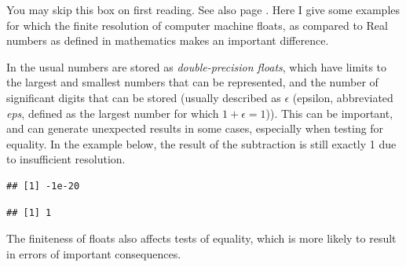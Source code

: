 \documentclass[krantz2]{krantz}\usepackage{knitr}%
\begin{document}
\begin{explainbox}
\label{box:floats} \label{par:float}
%
You may skip this box on first reading. See also page \pageref{par:float}. Here I give some examples for which the finite resolution of computer machine floats, as compared to Real numbers as defined in mathematics makes an important difference.

In \Rpgrm the usual numbers are stored as \emph{double-precision floats}, which have limits to the largest and smallest numbers that can be represented, and the number of significant digits that can be stored (usually described as $\epsilon$ (epsilon, abbreviated \emph{eps}, defined as the largest number for which $ 1 + \epsilon = 1$)). This can be important, and can generate unexpected results in some cases, especially when testing for equality. In the example below, the result of the subtraction is still exactly 1 due to insufficient resolution.

\begin{knitrout}\footnotesize
{}\color{fgcolor}\begin{kframe}
\begin{alltt}
 \hlopt{-} 
\end{alltt}
\begin{verbatim}
## [1] -1e-20
\end{verbatim}
\begin{alltt}
 \hlopt{-} 
\end{alltt}
\begin{verbatim}
## [1] 1
\end{verbatim}
\end{kframe}
\end{knitrout}

The finiteness of floats also affects tests of equality, which is more likely to result in errors of important consequences.


\end{explainbox}
\end{document}
